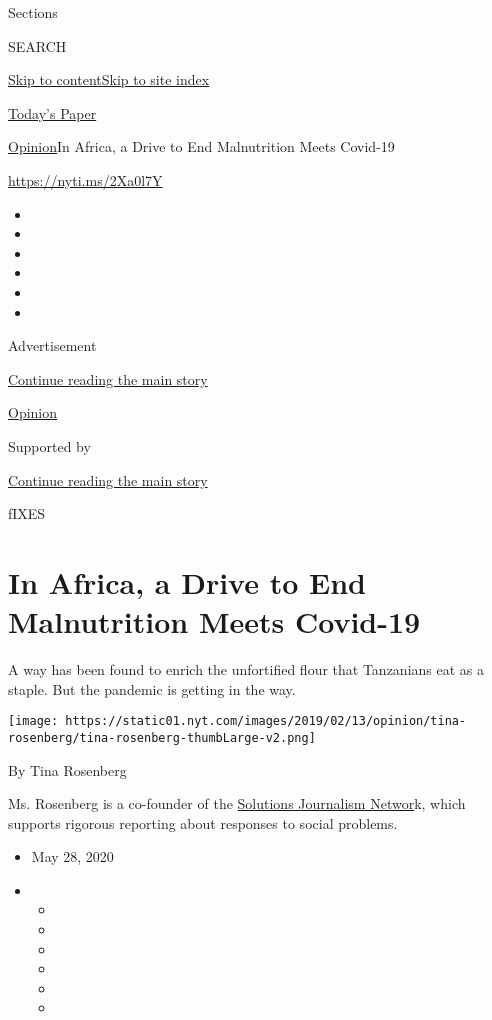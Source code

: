 Sections

SEARCH

\protect\hyperlink{site-content}{Skip to
content}\protect\hyperlink{site-index}{Skip to site index}

\href{https://myaccount.nytimes.com/auth/login?response_type=cookie\&client_id=vi}{}

\href{https://www.nytimes.com/section/todayspaper}{Today's Paper}

\href{/section/opinion}{Opinion}\textbar{}In Africa, a Drive to End
Malnutrition Meets Covid-19

\href{https://nyti.ms/2Xa0l7Y}{https://nyti.ms/2Xa0l7Y}

\begin{itemize}
\item
\item
\item
\item
\item
\item
\end{itemize}

Advertisement

\protect\hyperlink{after-top}{Continue reading the main story}

\href{/section/opinion}{Opinion}

Supported by

\protect\hyperlink{after-sponsor}{Continue reading the main story}

fIXES

\hypertarget{in-africa-a-drive-to-end-malnutrition-meets-covid-19}{%
\section{In Africa, a Drive to End Malnutrition Meets
Covid-19}\label{in-africa-a-drive-to-end-malnutrition-meets-covid-19}}

A way has been found to enrich the unfortified flour that Tanzanians eat
as a staple. But the pandemic is getting in the way.

\texttt{[image: https://static01.nyt.com/images/2019/02/13/opinion/tina-rosenberg/tina-rosenberg-thumbLarge-v2.png]}

By Tina Rosenberg

Ms. Rosenberg is a co-founder of the
\href{http://solutionsjournalism.org}{Solutions Journalism Networ}k,
which supports rigorous reporting about responses to social problems.

\begin{itemize}
\item
  May 28, 2020
\item
  \begin{itemize}
  \item
  \item
  \item
  \item
  \item
  \item
  \end{itemize}
\end{itemize}

